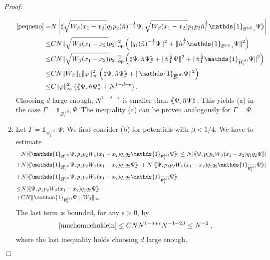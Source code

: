 \documentclass[11pt, english, american]{article}
\newcommand{\laa}{\langle\hspace{-0.08cm}\langle}
\newcommand{\raa}{\rangle\hspace{-0.08cm}\rangle}
\newenvironment{proof}{\emph{Proof:}}{\begin{flushright} $ \Box $ \end{flushright}}
\renewcommand{\phi}{\varphi}
\begin{document}
\begin{proof}
\begin{enumerate}
\begin{align*}
\eqref{pequeno}
=&  N\left|\laa \sqrt{W_\beta(x_1-x_2)} q_1p_2 (\hat{n})^{-\frac{1}{2}}   \Psi, 
\sqrt{W_\beta(x_1-x_2)} p_1p_2 \hat{n}_{1}^{\frac{1}{2}} \mathds{1}_{{\mathcal{B}^{(d)}}_{1}} \Psi\raa\right|  \\
\leq& CN \|\sqrt{W_\beta(x_1-x_2)} p_2 \|_{\text{op}}^2 
\left(  \|q_1 (\hat{n})^{-\frac{1}{2}}  \Psi \|^2 
+ \| \hat{n}_1^{\frac{1}{2}} \mathds{1}_{{\mathcal{B}^{(d)}}_{1}} \Psi \|^2
\right)  \\
\leq& CN \|\sqrt{W_\beta(x_1-x_2)} p_2 \|_{\text{op}}^2 
\left(  \laa \Psi, \hat{n} \Psi \raa 
+ \| \hat{n}_1^{\frac{1}{2}} \Psi \|^2
+ \| \hat{n}_1^{\frac{1}{2}} \mathds{1}_{{\overline{\mathcal{B}}^{(d)}_{1}}} \Psi \|^2
\right)  \\
\leq& CN \| W_\beta \|_1 \| \phi \|_\infty^2 
\left( \laa \Psi, \hat{n} \Psi \raa + \|  \mathds{1}_{{\overline{\mathcal{B}}^{(d)}_{1}}} \Psi \|^2
\right)  \\
\leq& C \| \phi \|_\infty^2  \left( \laa \Psi, \hat{n} \Psi \raa + N^{1 - d + \epsilon}  \right)
.
\end{align*}
Choosing $d$ large enough, $N^{1 - d + \epsilon}$ is smaller than $\laa \Psi, \hat{n} \Psi \raa$. This yields  (a) in the case
$\Gamma= \mathds{1}_{{\mathcal{B}_1^{(d)}}}  \Psi$.
The inequality (a) can be proven  analogously for $\Gamma= \Psi$.
\item
Let $\Gamma= \mathds{1}_{{\mathcal{B}_1^{(d)}}}  \Psi$.
 We first consider (b) for potentials with $\beta< 1/4$.
We have to estimate 
\begin{align}
&N|\laa \mathds{1}_{{\mathcal{B}_1^{(d)}}} \Psi ,p_1 p_2 W_\beta(x_1-x_2) q_1 q_2
\mathds{1}_{{\mathcal{B}^{(d)}_{1}}}\Psi
\raa|
\leq
N|\laa\Psi ,p_1 p_2 W_\beta(x_1-x_2) q_1 q_2
\Psi\raa|
\nonumber \\
+&
N|\laa \mathds{1}_{\overline{\mathcal{B}}^{(d)}_{1}}\Psi ,p_1 p_2 W_\beta(x_1-x_2) q_1 q_2
\Psi\raa|
+
N|\laa\Psi ,p_1 p_2 W_\beta(x_1-x_2) q_1 q_2
\mathds{1}_{\overline{\mathcal{B}^{(d)}_{1}}}\Psi\raa|
\nonumber \\
+&
\label{betaklein}
N|\laa \mathds{1}_{\overline{\mathcal{B}}^{(d)}_{1}}\Psi ,p_1 p_2 W_\beta(x_1-x_2) q_1 q_2
\mathds{1}_{\overline{\mathcal{B}^{(d)}_{1}}}\Psi\raa|
\nonumber
\\
\leq & 
N|\laa \Psi ,p_1 p_2 W_\beta(x_1-x_2) q_1 q_2
\Psi\raa|
\\
+&
\label{muchomuchoklein}
C N \|\mathds{1}_{\overline{\mathcal{B}}^{(d)}_{1}}\Psi\| \|W_\beta \|_\infty
\;.
\end{align}
The last term is bounded, for any $\epsilon>0$, by
\begin{align*}
\eqref{muchomuchoklein} \leq C  N N^{1-d+ \epsilon} N^{-1+2 \beta}
\leq
N^{-2} \; ,
\end{align*}
where the last inequality holds choosing $d$ large enough.


\end{enumerate}
\end{proof}
\end{document}
